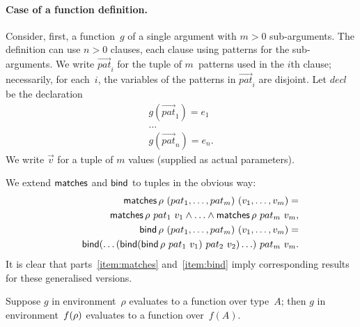 
\paragraph{Case of a function definition.}

Consider, first, a function~$g$ of a single argument with $m>0$ sub-arguments.
The definition can use $n>0$ clauses, each clause using patterns for the
sub-arguments.  We write $\vec{pat}_i$ for the tuple of $m$~patterns used in
the $i$th clause; necessarily, for each~$i$, the variables of the patterns in
$\vec{pat}_i$ are disjoint.  Let $decl$ be the declaration
\[
\begin{array}{c}
g(\vec{pat}_1) = e_1 \\
\ldots \\
g(\vec{pat}_n) = e_n.
\end{array}
\]
We write $\vec{v}$ for a tuple of $m$ values (supplied as actual parameters).

We extend $\mathop{\sf matches}$ and $\mathop{\sf bind}\nolimits$ to tuples in the obvious way:
\[
\begin{align}
\mathop{\sf matches} \rho~(pat_1,\ldots,pat_m)~(v_1,\ldots, v_m)  = \\
\qquad  \mathop{\sf matches} \rho~pat_1~v_1 \land \ldots \land \mathop{\sf matches} \rho~pat_m~v_m, \\
\mathop{\sf bind}\nolimits \rho~(pat_1,\ldots,pat_m)~(v_1,\ldots, v_m)  = \\
\qquad  \mathop{\sf bind}\nolimits(\ldots(\mathop{\sf bind}\nolimits (\mathop{\sf bind}\nolimits \rho~pat_1~v_1)~pat_2~v_2)\ldots)~pat_m~v_m.
\end{align}
\]
It is clear that parts~\ref{item:matches} and~\ref{item:bind} imply
corresponding results for these generalised versions.  

Suppose $g$ in environment~$\rho$ evaluates to a function over type~$A$; then
$g$ in environment~$f(\rho)$ evaluates to a function over~$f(A)$.

